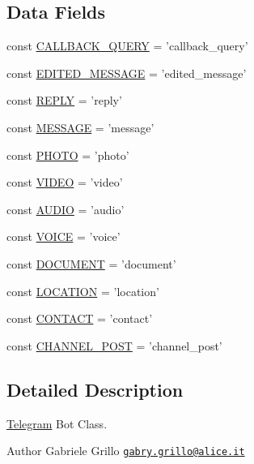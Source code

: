 \subsection*{Data Fields}
\begin{DoxyCompactItemize}
\item 
const \hyperlink{class_telegram_a464a4a095bb928388381b33e0babf9fe}{C\-A\-L\-L\-B\-A\-C\-K\-\_\-\-Q\-U\-E\-R\-Y} = 'callback\-\_\-query'
\item 
const \hyperlink{class_telegram_aa469cc007db1409d59a5e5bfac0633ec}{E\-D\-I\-T\-E\-D\-\_\-\-M\-E\-S\-S\-A\-G\-E} = 'edited\-\_\-message'
\item 
const \hyperlink{class_telegram_acb63774895b195d4c22afe2b089a3ddd}{R\-E\-P\-L\-Y} = 'reply'
\item 
const \hyperlink{class_telegram_af9b451d04eb24044a2d4112be10de570}{M\-E\-S\-S\-A\-G\-E} = 'message'
\item 
const \hyperlink{class_telegram_a0aeb08e94e66f9d958f565530b6b6a80}{P\-H\-O\-T\-O} = 'photo'
\item 
const \hyperlink{class_telegram_a333a9b0a1034beea1b4b505f30885cea}{V\-I\-D\-E\-O} = 'video'
\item 
const \hyperlink{class_telegram_a9f6cfe013372d7de1568a95c871214d1}{A\-U\-D\-I\-O} = 'audio'
\item 
const \hyperlink{class_telegram_a12e48e3d10ee66d0a6ca34c207d8e282}{V\-O\-I\-C\-E} = 'voice'
\item 
const \hyperlink{class_telegram_a6494d627239bf203e03297843bf52053}{D\-O\-C\-U\-M\-E\-N\-T} = 'document'
\item 
const \hyperlink{class_telegram_aca699735a6cec340e45cde5c623bdb32}{L\-O\-C\-A\-T\-I\-O\-N} = 'location'
\item 
const \hyperlink{class_telegram_aac7f4f1b55319f64ad56ae8a8222d9b5}{C\-O\-N\-T\-A\-C\-T} = 'contact'
\item 
const \hyperlink{class_telegram_a017c4bf971da66fae8b480ba38f2c44c}{C\-H\-A\-N\-N\-E\-L\-\_\-\-P\-O\-S\-T} = 'channel\-\_\-post'
\end{DoxyCompactItemize}


\subsection{Detailed Description}
\hyperlink{class_telegram}{Telegram} Bot Class.

\begin{DoxyAuthor}{Author}
Gabriele Grillo \href{mailto:gabry.grillo@alice.it}{\tt gabry.\-grillo@alice.\-it} 
\end{DoxyAuthor}


